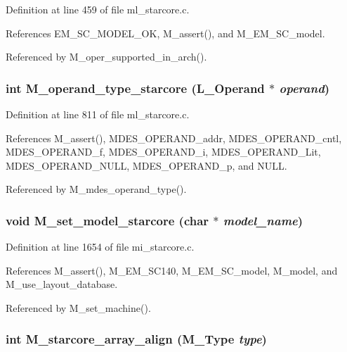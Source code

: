 Definition at line 459 of file ml\_\-starcore.c.

References EM\_\-SC\_\-MODEL\_\-OK, M\_\-assert(), and M\_\-EM\_\-SC\_\-model.

Referenced by M\_\-oper\_\-supported\_\-in\_\-arch().
\subsubsection{\setlength{\rightskip}{0pt plus 5cm}int M\_\-operand\_\-type\_\-starcore (L\_\-Operand $\ast$ {\em operand})}\label{m__starcore_8h_b442f0a0fc34c932c1f5ec8dd7cea303}




Definition at line 811 of file ml\_\-starcore.c.

References M\_\-assert(), MDES\_\-OPERAND\_\-addr, MDES\_\-OPERAND\_\-cntl, MDES\_\-OPERAND\_\-f, MDES\_\-OPERAND\_\-i, MDES\_\-OPERAND\_\-Lit, MDES\_\-OPERAND\_\-NULL, MDES\_\-OPERAND\_\-p, and NULL.

Referenced by M\_\-mdes\_\-operand\_\-type().
\subsubsection{\setlength{\rightskip}{0pt plus 5cm}void M\_\-set\_\-model\_\-starcore (char $\ast$ {\em model\_\-name})}\label{m__starcore_8h_0691646cf002ab7356290bf0ac43f641}




Definition at line 1654 of file mi\_\-starcore.c.

References M\_\-assert(), M\_\-EM\_\-SC140, M\_\-EM\_\-SC\_\-model, M\_\-model, and M\_\-use\_\-layout\_\-database.

Referenced by M\_\-set\_\-machine().
\subsubsection{\setlength{\rightskip}{0pt plus 5cm}int M\_\-starcore\_\-array\_\-align (\bf{M\_\-Type} {\em type})}\label{m__starcore_8h_7c2c3a053971ccabebfc2a2d93b87a83}




